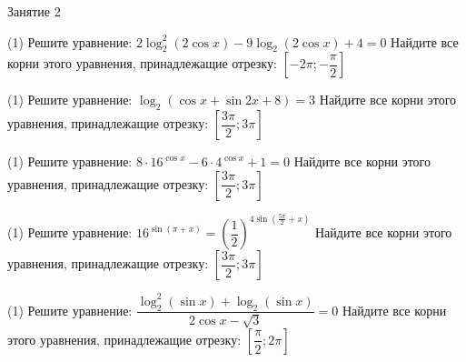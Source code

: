 \begin{class}[number=2]
	\begin{listofex}
		\item Занятие 2
	\end{listofex}
\end{class}

\begin{homework}[number=1]
	\begin{listofex}
		\item %
		\begin{tasks}(1)
			\task Решите уравнение: \( 2\log_2^2 (2\cos x) - 9 \log_2 (2\cos x) +4 = 0 \)
			\task Найдите все корни этого уравнения, принадлежащие отрезку: \( \left[ -2\pi; -\dfrac{\pi}{2} \right] \)
		\end{tasks}
		\item %
		\begin{tasks}(1)
			\task Решите уравнение: \( \log_2 (\cos x + \sin{2x} + 8) = 3 \)
			\task Найдите все корни этого уравнения, принадлежащие отрезку: \( \left[ \dfrac{3\pi}{2}; 3\pi \right] \)
		\end{tasks}
		\item %
		\begin{tasks}(1) 
			\task Решите уравнение: \( 8 \cdot 16^{\cos x} - 6 \cdot 4^{\cos x} + 1 = 0 \)
			\task Найдите все корни этого уравнения, принадлежащие отрезку: \( \left[ \dfrac{3\pi}{2}; 3 \pi \right] \)
		\end{tasks}
		\item %
		\begin{tasks}(1)
			\task Решите уравнение: \( 16^{\sin (\pi+x)}= \left( \dfrac{1}{2} \right)^{4\sin{(\frac{5\pi}{2}+x)}} \)
			\task Найдите все корни этого уравнения, принадлежащие отрезку: \( \left[ \dfrac{3\pi}{2}; 3\pi \right] \)
		\end{tasks}
		\item %
		\begin{tasks}(1)
			\task Решите уравнение: \( \dfrac{\log^2_2 (\sin x) + \log_2 (\sin{x})}{2\cos x - \sqrt{3}} = 0 \)
			\task Найдите все корни этого уравнения, принадлежащие отрезку: \( \left[ \dfrac{\pi}{2}; 2\pi \right] \)
		\end{tasks}
	\end{listofex}
\end{homework}

